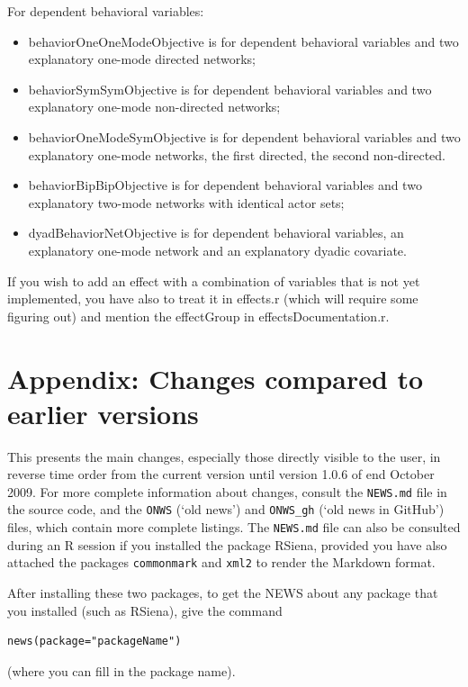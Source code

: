 \documentclass[a4paper,fleqn,11pt]{article}
\newcommand{\+}{\, + \,}
\newcommand{\sfn}[1]{\textsf{#1}}
\newcommand{\R}{{\sf R }}
\newcommand{\rs}{{\sf RSiena}}
\begin{document}
\noindent
For dependent behavioral variables:
\begin{itemize}
\item \sfn{behaviorOneOneModeObjective} is for dependent behavioral variables and
    two explanatory one-mode directed networks;
\item \sfn{behaviorSymSymObjective} is for dependent behavioral variables and
    two explanatory one-mode non-directed networks;
\item \sfn{behaviorOneModeSymObjective} is for dependent behavioral variables and
    two explanatory one-mode networks, the first directed, the second non-directed.
\item \sfn{behaviorBipBipObjective} is for dependent behavioral variables and
    two explanatory two-mode networks with identical actor sets;
\item \sfn{dyadBehaviorNetObjective} is for dependent behavioral variables,
   an explanatory one-mode network and an explanatory dyadic covariate.
\end{itemize}

If you wish to add an effect with a combination of variables that is not yet implemented,
you have also to treat it in \sfn{effects.r} (which will require some figuring out) and
mention the effectGroup in \sfn{effectsDocumentation.r}.


\appendix
\newpage

\section{Appendix: Changes compared to earlier versions}

This presents the main changes, especially those directly visible to the user,
in reverse time order from the current version until
version 1.0.6 of end October 2009.
For more complete information about changes,
consult the \texttt{NEWS.md} file in the source code,
and the \texttt{ONWS} (`old news') and \texttt{ONWS\_gh} (`old news in GitHub')  files,
which contain more complete listings.
The \texttt{NEWS.md} file can also be consulted during an \R session if you
installed the package \rs, provided you have also attached the
packages \texttt{commonmark} and \texttt{xml2} to render the Markdown format.

After installing these two packages,
to get the NEWS about any package that you installed
(such  as \rs), give the command
\begin{verbatim}
news(package="packageName")
\end{verbatim}
(where you can fill in the package name).
\bigskip
\end{document}
